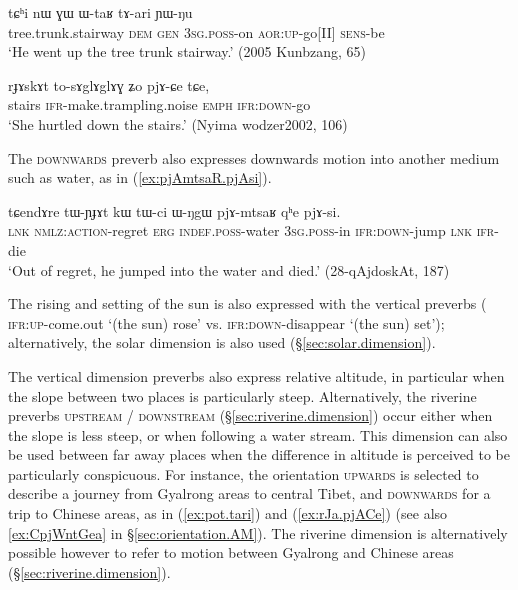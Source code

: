 \begin{exe}
\ex \label{ex:WtaR.tari}
 \gll tɕʰi nɯ ɣɯ ɯ-taʁ tɤ-ari ɲɯ-ŋu \\
 tree.trunk.stairway \textsc{dem} \textsc{gen} \textsc{3sg}.\textsc{poss}-on \textsc{aor}:\textsc{up}-go[II] \textsc{sens}-be \\
\glt `He went up the tree trunk stairway.' (2005 Kunbzang, 65)
\end{exe}

\begin{exe}
\ex \label{ex:rJAskAt.pjACe}
 \gll  rɟɤskɤt to-sɤglɤglɤɣ ʑo pjɤ-ɕe tɕe,   \\
stairs \textsc{ifr}-make.trampling.noise \textsc{emph} \textsc{ifr}:\textsc{down}-go \\
\glt `She hurtled down the stairs.' (Nyima wodzer2002, 106)
\end{exe}

The \textsc{downwards} preverb also expresses downwards motion into another medium such as water, as in (\ref{ex:pjAmtsaR.pjAsi}).

\begin{exe}
\ex \label{ex:pjAmtsaR.pjAsi}
 \gll tɕendɤre tɯ-ɲɟɤt kɯ tɯ-ci ɯ-ŋgɯ pjɤ-mtsaʁ qʰe pjɤ-si. \\
 \textsc{lnk} \textsc{nmlz}:\textsc{action}-regret \textsc{erg} \textsc{indef}.\textsc{poss}-water \textsc{3sg}.\textsc{poss}-in \textsc{ifr}:\textsc{down}-jump \textsc{lnk} \textsc{ifr}-die \\
 \glt `Out of regret, he jumped into the water and died.' (28-qAjdoskAt, 187)
\end{exe}

The rising and setting of the sun is also expressed with the vertical preverbs ( \textsc{ifr}:\textsc{up}-come.out `(the sun) rose' vs.  \textsc{ifr}:\textsc{down}-disappear `(the sun) set'); alternatively, the solar dimension is also used (§\ref{sec:solar.dimension}).

The vertical dimension preverbs also express relative altitude, in particular when the slope between two places is particularly steep. Alternatively, the riverine preverbs \textsc{upstream} / \textsc{downstream} (§\ref{sec:riverine.dimension}) occur either when the slope is less steep, or when following a water stream. This dimension can also be used between far away places when the difference in altitude is perceived to be particularly conspicuous. For instance, the orientation \textsc{upwards} is selected to describe a journey from Gyalrong areas to central Tibet, and \textsc{downwards} for a trip to Chinese areas, as in (\ref{ex:pot.tari}) and (\ref{ex:rJa.pjACe}) (see also \ref{ex:CpjWntGea} in §\ref{sec:orientation.AM}). The riverine dimension is alternatively possible however to refer to motion between Gyalrong and Chinese areas (§\ref{sec:riverine.dimension}).

